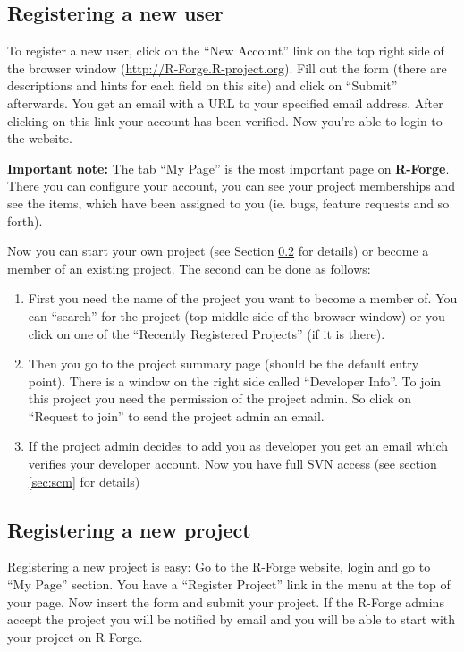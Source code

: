 \documentclass[a4paper]{article}
\begin{document}
\subsection{Registering a  new user}

To register a new user, click on the ``New Account'' link on the top
right side of the browser window (\url{http://R-Forge.R-project.org}).
Fill out the form (there are descriptions and hints for each field on
this site) and click on ``Submit'' afterwards. You get an email with
a URL to your specified email address. After clicking on this link
your account has been verified. Now you're able to login to the
website.
\newline

\textbf{Important note:} The tab ``My Page'' is the most important
page on \textbf{R-Forge}. There you can configure your account, you can see your
project memberships and see the items, which have been assigned to you
(ie. bugs, feature requests and so forth).
\newline

Now you can start your own project (see Section \ref{sec:newproject}
for details) or become a member of an existing project. The second
can be done as follows:

\begin{enumerate}
\item First you need the name of the project you want to become a
  member of. You can ``search'' for the project (top middle side of the
  browser window) or you click on one of the ``Recently Registered
  Projects'' (if it is there).
\item Then you go to the project summary page (should be the default
  entry point). There is a window on the right side called
  ``Developer Info''. To join this project you need the permission of
  the project admin. So click on ``Request to join'' to send the
  project admin an email.
\item If the project admin decides to add you as developer you get an
  email which verifies your developer account. Now you have full SVN
  access (see section \ref{sec:scm} for details)
\end{enumerate}

\subsection{Registering a new project}
\label{sec:newproject}

Registering a new project is easy: Go to the R-Forge website, login and
go to ``My Page'' section. You have a ``Register Project'' link in the
menu at the top of your page. Now insert the form and submit your
project. If the R-Forge admins accept the project you will be notified
by email and you will be able to start with your project on R-Forge.
\end{document}
